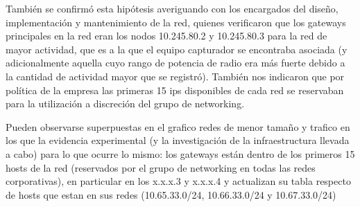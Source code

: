 También se confirmó esta hipótesis averiguando con los encargados del diseño, implementación y mantenimiento de la red, quienes verificaron que los gateways principales en la red eran los nodos 10.245.80.2 y 10.245.80.3 para la red de mayor actividad, que es a la que el equipo capturador se encontraba asociada (y adicionalmente aquella cuyo rango de potencia de radio era más fuerte debido a la cantidad de actividad mayor que se registró). También nos indicaron que por política de la empresa las primeras 15 ips disponibles de cada red se reservaban para la utilización a discreción del grupo de networking.

Pueden observarse superpuestas en el grafico redes de menor tamaño y trafico en los que la evidencia experimental (y la investigación de la infraestructura llevada a cabo) para lo que ocurre lo mismo: los gateways están dentro de los primeros 15 hosts de la red (reservados por el grupo de networking en todas las redes corporativas), en particular en los x.x.x.3 y x.x.x.4 y actualizan su tabla respecto de hosts que estan en sus redes (10.65.33.0/24, 10.66.33.0/24 y 10.67.33.0/24)